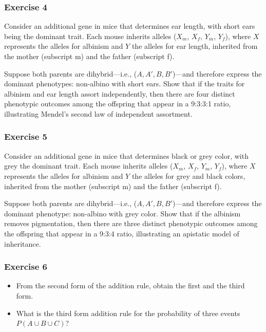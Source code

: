 \documentclass[
]{book}
\begin{document}
\hypertarget{exercise-4}{%
\subsubsection{Exercise 4}\label{exercise-4}}

Consider an additional gene in mice that determines ear length, with short ears being the dominant trait. Each mouse inherits alleles (\(X_m\), \(X_f\), \(Y_m\), \(Y_f\)), where \(X\) represents the alleles for albinism and \(Y\) the alleles for ear length, inherited from the mother (subscript m) and the father (subscript f).

Suppose both parents are dihybrid---i.e., (\(A,A',B,B'\))---and therefore express the dominant phenotypes: non-albino with short ears. Show that if the traits for albinism and ear length assort independently, then there are four distinct phenotypic outcomes among the offspring that appear in a 9:3:3:1 ratio, illustrating Mendel's second law of independent assortment.

\hypertarget{exercise-5}{%
\subsubsection{Exercise 5}\label{exercise-5}}

Consider an additional gene in mice that determines black or grey color, with grey the dominant trait. Each mouse inherits alleles (\(X_m\), \(X_f\), \(Y_m\), \(Y_f\)), where \(X\) represents the alleles for albinism and \(Y\) the alleles for grey and black colors, inherited from the mother (subscript m) and the father (subscript f).

Suppose both parents are dihybrid---i.e., (\(A,A',B,B'\))---and therefore express the dominant phenotype: non-albino with grey color. Show that if the albinism removes pigmentation, then there are three distinct phenotypic outcomes among the offspring that appear in a 9:3:4 ratio, illustrating an apistatic model of inheritance.

\hypertarget{exercise-6}{%
\subsubsection{Exercise 6}\label{exercise-6}}

\begin{itemize}
\item
  From the second form of the addition rule, obtain the first and the third form.
\item
  What is the third form addition rule for the probability of three events \(P(A \cup B \cup C)\)?
\end{itemize}
\end{document}
